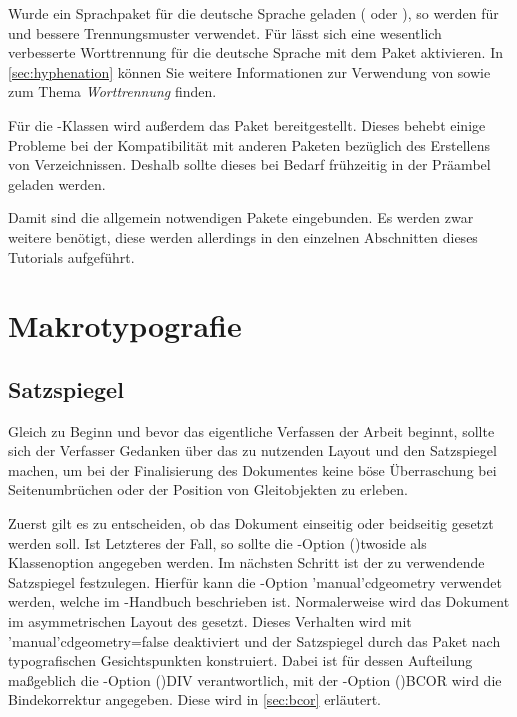\documentclass[%
  english,ngerman,%
  cdgeometry=no,DIV=12,%
  cd=false,cdfont=false,cdtitle=true,%
  headings=normal,%
  automark,%
  listof=toc,%
]{tudscrartcl}
\begin{document}
Wurde ein Sprachpaket für die deutsche Sprache geladen ( oder 
), so werden für  und  
bessere Trennungsmuster verwendet. Für  lässt sich eine 
wesentlich verbesserte Worttrennung für die deutsche Sprache mit dem Paket 
 aktivieren. In \autoref{sec:hyphenation} können Sie weitere 
Informationen zur Verwendung von  sowie zum Thema 
\emph{Worttrennung} finden.
%
\begin{Preamble}
\usepackage{iftex}
\iftutex
  \usepackage{fontspec}
\else
  \usepackage[T1]{fontenc}
  \usepackage[ngerman=ngerman-x-latest]{hyphsubst}
\fi
\end{Preamble}
%
Für die \KOMAScript-Klassen wird außerdem das Paket  
bereitgestellt. Dieses behebt einige Probleme bei der Kompatibilität mit 
anderen Paketen bezüglich des Erstellens von Verzeichnissen. Deshalb sollte 
dieses bei Bedarf frühzeitig in der Präambel geladen werden. 
%
\begin{Preamble}
\usepackage{scrhack}
\end{Preamble}
%
Damit sind die allgemein notwendigen Pakete eingebunden. Es werden zwar weitere 
benötigt, diese werden allerdings in den einzelnen Abschnitten dieses Tutorials 
aufgeführt.



\section{Makrotypografie}
\subsection{Satzspiegel}

Gleich zu Beginn und bevor das eigentliche Verfassen der Arbeit beginnt, sollte 
sich der Verfasser Gedanken über das zu nutzenden Layout und den Satzspiegel 
machen, um bei der Finalisierung des Dokumentes keine böse Überraschung bei 
Seitenumbrüchen oder der Position von Gleitobjekten zu erleben.

Zuerst gilt es zu entscheiden, ob das Dokument einseitig oder beidseitig 
gesetzt werden soll. Ist Letzteres der Fall, so sollte die \KOMAScript-Option 
\Option(){twoside} als Klassenoption angegeben werden. Im 
nächsten Schritt ist der zu verwendende Satzspiegel festzulegen. Hierfür kann 
die \TUDScript-Option \Option'manual'{cdgeometry} verwendet werden, welche im 
\TUDScript-Handbuch beschrieben ist. Normalerweise wird das Dokument im 
asymmetrischen Layout des \CDs gesetzt.
%
Dieses Verhalten wird mit \Option*'manual'{cdgeometry=false} deaktiviert und 
der Satzspiegel durch das Paket  nach typografischen 
Gesichtspunkten konstruiert. Dabei ist für dessen Aufteilung maßgeblich die 
\KOMAScript-Option \Option(){DIV} verantwortlich, mit der 
\KOMAScript-Option \Option(){BCOR} wird die Bindekorrektur 
angegeben. Diese wird in \autoref{sec:bcor} erläutert.
\end{document}

